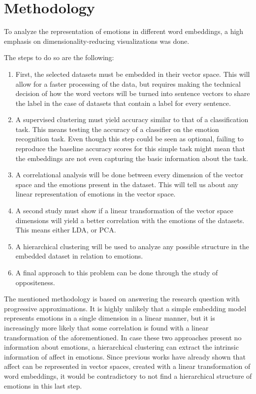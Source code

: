 \chapter{Methodology}\label{chap:Methodology}

To analyze the representation of emotions in different word embeddings, a high emphasis on dimensionality-reducing visualizations was done.

The steps to do so are the following:
\begin{enumerate}
  \item First, the selected datasets must be embedded in their vector space. This will allow for a faster processing of the data, but requires making the technical decision of how the word vectors will be turned into sentence vectors to share the label in the case of datasets that contain a label for every sentence.
  \item A supervised clustering must yield accuracy similar to that of a classification task. This means testing the accuracy of a classifier on the emotion recognition task. Even though this step could be seen as optional, failing to reproduce the baseline accuracy scores for this simple task might mean that the embeddings are not even capturing the basic information about the task.
  \item A correlational analysis will be done between every dimension of the vector space and the emotions present in the dataset. This will tell us about any linear representation of emotions in the vector space.
  \item A second study must show if a linear transformation of the vector space dimensions will yield a better correlation with the emotions of the datasets. This means either LDA, or PCA\@.
  \item A hierarchical clustering will be used to analyze any possible structure in the embedded dataset in relation to emotions.
  \item A final approach to this problem can be done through the study of oppositeness.
\end{enumerate}

The mentioned methodology is based on answering the research question with progressive approximations. It is highly unlikely that a simple embedding model represents emotions in a single dimension in a linear manner, but it is increasingly more likely that some correlation is found with a linear transformation of the aforementioned. In case these two approaches present no information about emotions, a hierarchical clustering can extract the intrinsic information of affect in emotions. Since previous works have already shown that affect can be represented in vector spaces, created with a linear transformation of word embeddings\cite{TODO}, it would be contradictory to not find a hierarchical structure of emotions in this last step.


